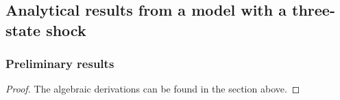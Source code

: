 \documentclass[11pt]{article}
\begin{document}
\begin{singlespace}
		\subsection{Analytical results from a model with a three-state shock}
		\label{S:AnalyticalResults}
		
		\subsubsection{Preliminary results}	
		\propone*
		
		\begin{proof}
			The algebraic derivations can be found in the section above. 
		\end{proof}
		

\end{singlespace}
\end{document}
